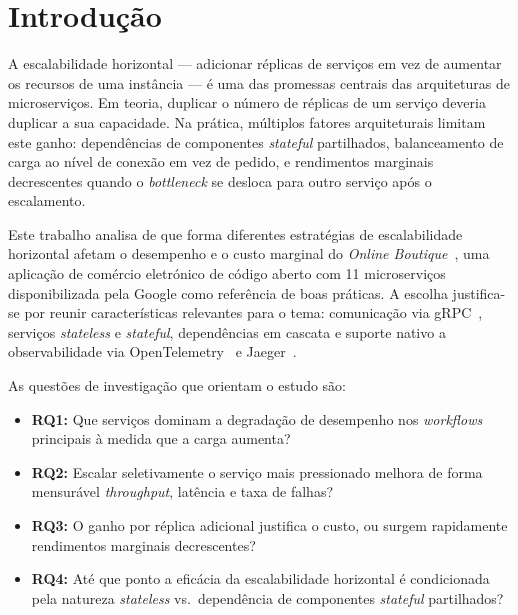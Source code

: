 \documentclass[acmsmall,screen=true,nonacm]{acmart}
\begin{document}
\section{Introdução}

A escalabilidade horizontal — adicionar réplicas de serviços em vez de aumentar os recursos de uma instância — é uma das promessas centrais das arquiteturas de microserviços. Em teoria, duplicar o número de réplicas de um serviço deveria duplicar a sua capacidade. Na prática, múltiplos fatores arquiteturais limitam este ganho: dependências de componentes \textit{stateful} partilhados, balanceamento de carga ao nível de conexão em vez de pedido, e rendimentos marginais decrescentes quando o \textit{bottleneck} se desloca para outro serviço após o escalamento.

Este trabalho analisa de que forma diferentes estratégias de escalabilidade horizontal afetam o desempenho e o custo marginal do \textit{Online Boutique}~\cite{onlineboutique}, uma aplicação de comércio eletrónico de código aberto com 11 microserviços disponibilizada pela Google como referência de boas práticas. A escolha justifica-se por reunir características relevantes para o tema: comunicação via gRPC~\cite{grpc}, serviços \textit{stateless} e \textit{stateful}, dependências em cascata e suporte nativo a observabilidade via OpenTelemetry~\cite{otel} e Jaeger~\cite{jaeger}.

As questões de investigação que orientam o estudo são:
\begin{itemize}
  \item \textbf{RQ1:} Que serviços dominam a degradação de desempenho nos \textit{workflows} principais à medida que a carga aumenta?
  \item \textbf{RQ2:} Escalar seletivamente o serviço mais pressionado melhora de forma mensurável \textit{throughput}, latência e taxa de falhas?
  \item \textbf{RQ3:} O ganho por réplica adicional justifica o custo, ou surgem rapidamente rendimentos marginais decrescentes?
  \item \textbf{RQ4:} Até que ponto a eficácia da escalabilidade horizontal é condicionada pela natureza \textit{stateless} vs.\ dependência de componentes \textit{stateful} partilhados?
\end{itemize}

\end{document}
